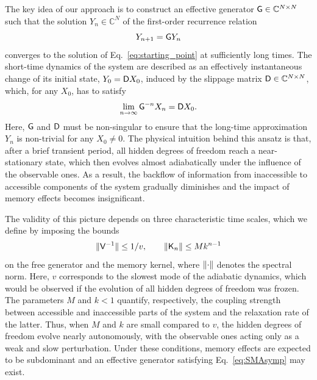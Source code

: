 \documentclass[aps,prl,reprint]{revtex4-2}
\begin{document}
The key idea of our approach is to construct an effective generator $\mathsf{G}\in\mathbb{C}^{N\times N}$ such that the solution $Y_n\in\mathbb{C}^N$ of the first-order recurrence relation
\begin{equation}\label{eq:LTApprox}
	Y_{n+1} = \mathsf{G} Y_n
\end{equation}
converges to the solution of Eq.~\eqref{eq:starting_point} at sufficiently long times.
The short-time dynamics of the system are described as an effectively instantaneous change of its initial state, $Y_0 = \mathsf{D} X_0$, induced by the slippage matrix $\mathsf{D} \in \mathbb{C}^{N \times N}$, which, for any $X_0$, has to satisfy
\begin{equation}\label{eq:SMAsymp}
	\lim_{n\rightarrow\infty} \mathsf{G}^{-n} X_n = \mathsf{D} X_0.
\end{equation}
Here, $\mathsf{G}$ and $\mathsf{D}$ must be non-singular to ensure that the long-time approximation $Y_n$ is non-trivial for any $X_0\neq 0$.
The physical intuition behind this ansatz is that, after a brief transient period, all hidden degrees of freedom reach a near-stationary state, which then evolves almost adiabatically under the influence of the observable ones.
As a result, the backflow of information from inaccessible to accessible components of the system gradually diminishes and the impact of memory effects becomes insignificant.

The validity of this picture depends on three characteristic time scales, which we define by imposing the bounds
\begin{equation}\label{eq:WMC1}
	 \lVert \mathsf{V}^{-1} \rVert\leq 1/v, \qquad \lVert \mathsf{K}_n \rVert\leq Mk^{n-1}
\end{equation}
on the free generator and the memory kernel, where $\lVert \cdot \rVert$ denotes the spectral norm.
Here, $v$ corresponds to the slowest mode of the adiabatic dynamics, which would be observed if the evolution of all hidden degrees of freedom was frozen.
The parameters $M$ and $k < 1$ quantify, respectively, the coupling strength between accessible and inaccessible parts of the system and the relaxation rate of the latter.
Thus, when $M$ and $k$ are small compared to $v$, the hidden degrees of freedom evolve nearly autonomously, with the observable ones acting only as a weak and slow perturbation.
Under these conditions, memory effects are expected to be subdominant and an effective generator satisfying Eq.~\eqref{eq:SMAsymp} may exist.
\end{document}
